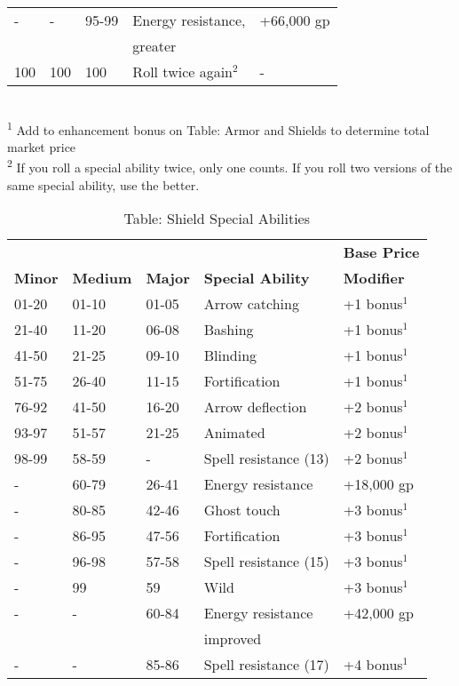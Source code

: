 \begin{table}[]
\begin{tabularx}{\linewidth}{lllXl}
- & - & 95-99 & Energy resistance, & +66,000 gp \\
  &   &       & greater & \\
100 & 100 & 100 & Roll twice again\(^{2}\) & -\\
\end{tabularx}\\
\textsuperscript{1} Add to enhancement bonus on Table: Armor and Shields to determine total market price\\
\textsuperscript{2} If you roll a special ability twice, only one counts. If you roll two versions of the same special ability, use the better.\\
\end{table}

\begin{table}[]
\sffamily
\caption{Table: Shield Special Abilities}
\setlength{\tabcolsep}{1pt}
\begin{tabular}{lllll}
               &                 &                &                          & \textbf{Base Price} \\
\textbf{Minor} & \textbf{Medium} & \textbf{Major} & \textbf{Special Ability} & \textbf{Modifier}\\
01-20 & 01-10 & 01-05 & Arrow catching & +1 bonus\(^{1}\)\\
21-40 & 11-20 & 06-08 & Bashing & +1 bonus\(^{1}\)\\
41-50 & 21-25 & 09-10 & Blinding & +1 bonus\(^{1}\)\\
51-75 & 26-40 & 11-15 & Fortification & +1 bonus\(^{1}\)\\
76-92 & 41-50 & 16-20 & Arrow deflection & +2 bonus\(^{1}\)\\
93-97 & 51-57 & 21-25 & Animated & +2 bonus\(^{1}\)\\
98-99 & 58-59 & - & Spell resistance (13) & +2 bonus\(^{1}\)\\
- & 60-79 & 26-41 & Energy resistance & +18,000 gp\\
- & 80-85 & 42-46 & Ghost touch & +3 bonus\(^{1}\)\\
- & 86-95 & 47-56 & Fortification & +3 bonus\(^{1}\)\\
- & 96-98 & 57-58 & Spell resistance (15) & +3 bonus\(^{1}\)\\
- & 99 & 59 & Wild & +3 bonus\(^{1}\)\\
- & - & 60-84 & Energy resistance & +42,000 gp \\
  &   &       & improved          & \\
- & - & 85-86 & Spell resistance (17) & +4 bonus\(^{1}\)\\

\end{tabular}
\end{table}
